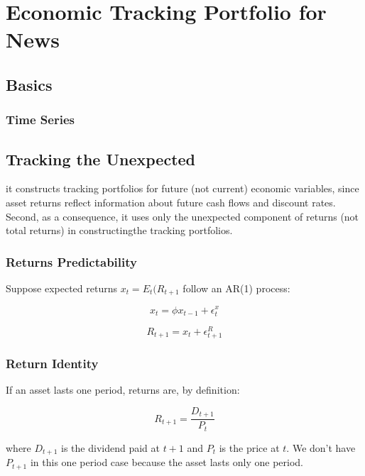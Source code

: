 \chapter{Economic Tracking Portfolio for News}

\section{Basics}

\subsection{Time Series}

\section{Tracking the Unexpected}

it constructs tracking portfolios for future (not current) 
economic variables, since asset returns reflect 
information about future cash flows and discount
rates. 
Second, as a consequence, it uses 
only the unexpected component of
returns (not total returns) 
in constructingthe tracking portfolios.

\subsection{Returns Predictability}

Suppose expected returns $x_t = E_t(R_{t+1}$ follow an 
AR(1) process:

\begin{equation}
    x_t = \phi x_{t-1} + \epsilon^x_t
\end{equation}

\begin{equation}
    R_{t+1} = x_t + \epsilon^R_{t+1}
\end{equation}


\subsection{Return Identity}

If an asset lasts one period, returns are, by definition:

\begin{equation}
    R_{t+1} = \frac{D_{t+1} }{P_t}
\end{equation}

where $D_{t+1}$ is the dividend paid at $t+1$ and $P_t$ is the price at $t$.
We don't have $P_{t+1}$ in this one period case because the asset 
lasts only one period.

